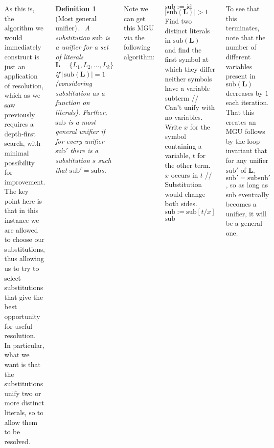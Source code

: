 \documentclass{tikzposter} %
\newtheorem{definition}{Definition}
\begin{document}
\begin{columns}
{{      As this is, the algorithm we would immediately construct is just an application of resolution, which as we saw previously requires a depth-first search, with minimal possibility for improvement. The key point here is that in this instance we are allowed to choose our substitutions, thus allowing us to try to select substitutions that give the best opportunity for useful resolution. \\

      In particular, what we want is that the substitutions unify two or more distinct literals, so to allow them to be resolved. \\

      \begin{definition}[Most general unifier]
      \ A substitution $\mathrm{sub}$ is a unifier for a set of literals $\bm{L} = \{L_{1},L_{2},\dots,L_{k}\}$ if $|\mathrm{sub}(\bm{L})| = 1$ (considering substitution as a function on literals). Further, $\mathrm{sub}$ is a most general unifier if for every unifier $\mathrm{sub}'$ there is a substitution $s$ such that $\mathrm{sub}' = \mathrm{sub}s$.
      \end{definition}
      \hphantom{}

      Note we can get this MGU via the following algorithm:
      \begin{codebox}
        \li $\mathrm{sub} := \mathrm{id}$
        \li \While $|\mathrm{sub}(\bm{L})| > 1$ \Do
        \li   Find two distinct literals in $\mathrm{sub}(\bm{L})$ \\
              \> and find the first symbol at which they differ
        \li   \If neither symbols have a variable subterm \Then
        \li     \Return {} \>\>\>\>\>\> // Can't unify with no variables.
        \li   \Else
        \li     Write $x$ for the symbol containing a variable, $t$ for the other term.
        \li     \If $x$ occurs in $t$ \Then
        \li       \Return {} \>\>\>\>\> // Substitution would change both sides.
        \li     \Else
        \li       $\mathrm{sub} := \mathrm{sub}[t/x]$
                \End
              \End
            \End
        \li \Return $\mathrm{sub}$
      \end{codebox}
      To see that this terminates, note that the number of different variables present in $\mathrm{sub}(\bm{L})$ decreases by $1$ each iteration. That this creates an MGU follows by the loop invariant that for any unifier $\mathrm{sub}'$ of $\bm{L}$, $\mathrm{sub}' = \mathrm{sub} \mathrm{sub}'$, so as long as $\mathrm{sub}$ eventually becomes a unifier, it will be a general one.
    }
    \hphantom{}

}
\end{columns}
\end{document}
